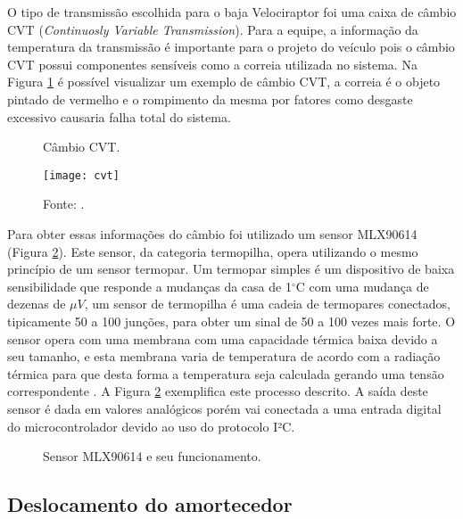 O tipo de transmissão escolhida para o baja Velociraptor foi uma caixa de câmbio CVT (\textit{Continuosly Variable Transmission}). Para a equipe, a informação da temperatura da transmissão é importante para o projeto do veículo pois o câmbio CVT possui componentes sensíveis como a correia utilizada no sistema. Na Figura \ref{fig:cvt} é possível visualizar um exemplo de câmbio CVT, a correia é o objeto pintado de vermelho e o rompimento da mesma por fatores como desgaste excessivo causaria falha total do sistema. 

\begin{figure}[!htb]
	\centering
		\caption{Câmbio CVT.}
		\texttt{[image: cvt]} 
		\caption*{Fonte: \cite{cvt}.}
		\label{fig:cvt}
\end{figure} 

Para obter essas informações do câmbio foi utilizado um sensor MLX90614 (Figura \ref{fig:sensorCvt}). Este sensor, da categoria termopilha, opera utilizando o mesmo princípio de um sensor termopar. Um termopar simples é um dispositivo de baixa sensibilidade que responde a mudanças da casa de 1$^\circ$C com uma mudança de dezenas de $\mu V$, um sensor de termopilha é uma cadeia de termopares conectados, tipicamente 50 a 100 junções, para obter um sinal de 50 a 100 vezes mais forte. O sensor opera com uma membrana com uma capacidade térmica baixa devido a seu tamanho, e esta membrana varia de temperatura de acordo com a radiação térmica para que desta forma a temperatura seja calculada gerando uma tensão correspondente \cite{Fraden2016}. A Figura \ref{fig:sensorCvt} exemplifica este processo descrito. A saída deste sensor é dada em valores analógicos porém vai conectada a uma entrada digital do microcontrolador devido ao uso do protocolo I²C.       

\begin{figure}[!htb]
	\center
	\caption{Sensor MLX90614 e seu funcionamento.}
	\qquad
	\label{fig:sensorCvt}
\end{figure}

\subsection{Deslocamento do amortecedor}

